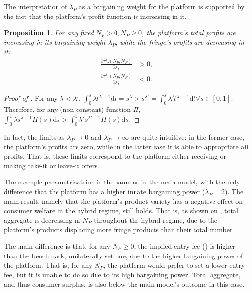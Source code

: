 \documentclass[a4paper]{article}
\newtheorem{proposition}{Proposition}
\newcommand{\dt}{\mathrm{d}t}
\newcommand{\ds}{\mathrm{d}s}
\begin{document}
The interpretation of $\lambda_P$ as a bargaining weight for the platform is supported by the fact that the platform's profit function is increasing in it.
\begin{proposition}
    \label{prop:lambda_P_comparative}
    For any fixed $N_F >0, N_P \geq 0$, the platform's total profits are increasing in its bargaining weight $\lambda_P$, while the fringe's profits are decreasing in it:
    \begin{align*}
        \frac{\partial \pi_P^t(N_P, N_F)}{\partial \lambda_P} &> 0, \\
        \frac{\partial \pi_F^t(N_P, N_F)}{\partial \lambda_P} &< 0.
    \end{align*}
\end{proposition}
\begin{proof}[Proof of ]
    For any $\lambda < \lambda'$, $\int_0^s \lambda t^{\lambda - 1} \dt = s^\lambda > s^{\lambda'} = \int_0^s \lambda' t^{\lambda' - 1} \dt \forall s \in [0, 1]$.
    Therefore, for any (non-constant) function $\Pi$, $\int_0^1 \lambda s^{\lambda - 1} \Pi(s) \ds > \int_0^1 \lambda' s^{\lambda' - 1} \Pi(s) \ds$.
\end{proof}
In fact, the limits as $\lambda_P \to 0$ and $\lambda_P \to \infty$ are quite intuitive: in the former case, the platform's profits are zero, while in the latter case it is able to appropriate all profits.
That is, these limits correspond to the platform either receiving or making take-it or leave-it offers.

The example parametrizatrion is the same as in the main model, with the only difference that the platform has a higher innate bargaining power ($\lambda_P = 2$).
The main result, namely that the platform's product variety has a negative effect on consumer welfare in the hybrid regime, still holds.
That is, as shown on , total aggregate is decreasing in $N_P$ throughout the hybrid regime, due to the platform's products displacing more fringe products than their total number.

The main difference is that, for any $N_P\geq 0$, the implied entry fee () is higher than the benchmark, unilaterally set one,  due to the higher bargaining power of the platform.
That is, for any $N_P$, the platform would prefer to set a lower entry fee, but it is unable to do so due to its high bargaining power.
Total aggregate, and thus consumer surplus, is also below the main model's outcome in this case.
\end{document}
